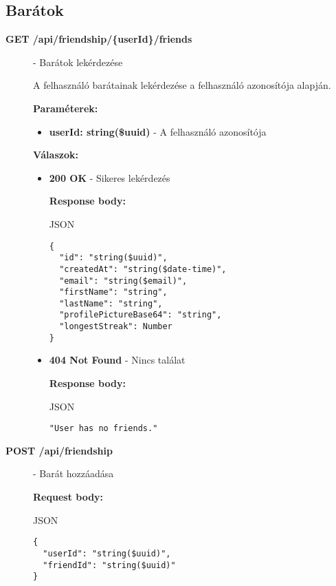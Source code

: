 \documentclass[12pt]{report}
\begin{document}
\subsection{Barátok}
\begin{description}
  \item[\textbf{GET /api/friendship/\{userId\}/friends}] - Barátok lekérdezése

    \vspace{0.5cm}
    A felhasználó barátainak lekérdezése a felhasználó azonosítója alapján.

    \vspace{0.5cm}
    \textbf{Paraméterek:}
    \begin{itemize}
      \item \textbf{userId: string(\$uuid)} - A felhasználó azonosítója
    \end{itemize}

    \vspace{0.5cm}
    \textbf{Válaszok:}
    \begin{itemize}
      \item \textbf{200 OK} - Sikeres lekérdezés

        \textbf{Response body:}
        \begin{codeblock}{JSON}
          \begin{verbatim}
{
  "id": "string($uuid)",
  "createdAt": "string($date-time)",
  "email": "string($email)",
  "firstName": "string",
  "lastName": "string",
  "profilePictureBase64": "string",
  "longestStreak": Number
}
          \end{verbatim}
        \end{codeblock}

      \item \textbf{404 Not Found} - Nincs találat
      
        \textbf{Response body:}
        \begin{codeblock}{JSON}
          \begin{verbatim}
"User has no friends."
          \end{verbatim}
        \end{codeblock}
    \end{itemize}

  \item[\textbf{POST /api/friendship}] - Barát hozzáadása
  
    \vspace{0.5cm}
    \textbf{Request body:}
    \begin{codeblock}{JSON}
      \begin{verbatim}
{
  "userId": "string($uuid)",
  "friendId": "string($uuid)"
}
      \end{verbatim}
    \end{codeblock}


\end{description}
\end{document}

